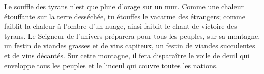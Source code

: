 Le souffle des tyrans n’est que pluie d’orage sur un mur.
Comme une chaleur étouffante sur la terre desséchée,
	tu étouffes le vacarme des étrangers;
	comme faiblit la chaleur à l’ombre d’un nuage,
	ainsi faiblit le chant de victoire des tyrans.
Le Seigneur de l’univers préparera pour tous les peuples, sur sa montagne,
	un festin de viandes grasses et de vins capiteux,
	un festin de viandes succulentes et de vins décantés.
Sur cette montagne,
	il fera disparaître le voile de deuil qui enveloppe tous les peuples
	et le linceul qui couvre toutes les nations.
